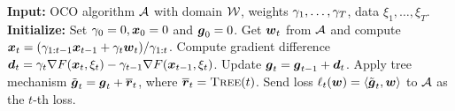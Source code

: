 \begin{algorithm}[t]
    \begin{algorithmic}[1]
        \Statex \textbf{Input:} OCO algorithm ${\cal A}$ with domain ${\cal W}$, weights $\gamma_1,\ldots,\gamma_T$, data $\xi_1,\ldots,\xi_T$.
        \State \textbf{Initialize:} Set $\gamma_0 = 0, {\boldsymbol{x}}_0 = 0$ and ${\boldsymbol{g}}_0 = 0$. 
            \State Get ${\boldsymbol{w}}_t$ from ${\cal A}$ and compute ${\boldsymbol{x}}_t = (\gamma_{1:t-1}{\boldsymbol{x}}_{t-1}+\gamma_t {\boldsymbol{w}}_t)/\gamma_{1:t}$.
            \State Compute gradient difference ${\boldsymbol{d}}_t = \gamma_t\nabla F({\boldsymbol{x}}_t,\xi_t)-\gamma_{t-1}\nabla F({\boldsymbol{x}}_{t-1},\xi_t)$.
            \State Update ${\boldsymbol{g}}_t = {\boldsymbol{g}}_{t-1} + {\boldsymbol{d}}_t$.
            \State Apply tree mechanism $\tilde{{\boldsymbol{g}}}_t = {\boldsymbol{g}}_t + \overline{{\boldsymbol{r}}}_t$, where $\overline{{\boldsymbol{r}}}_t={\normalfont\textsc{Tree}}(t)$.
            \State Send loss $\ell_t({\boldsymbol{w}}) = \langle \tilde{{\boldsymbol{g}}}_t, {\boldsymbol{w}}\rangle$ to ${\cal A}$ as the $t$-th loss.
        \EndFor
    \end{algorithmic}
    \caption{Differentially-Private Online-to-Batch (DP-OTB)}
    \label{alg:DP-OTB:main}
\end{algorithm}